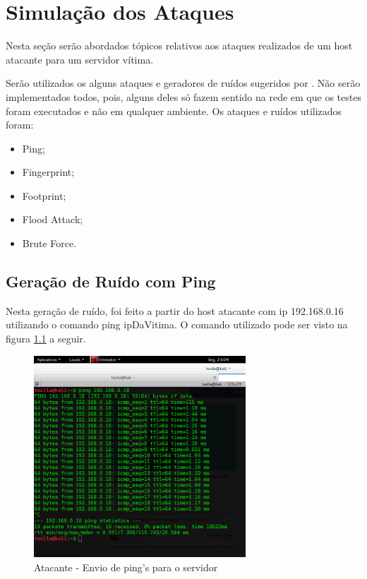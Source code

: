\chapter{Simulação dos Ataques}
\label{chap:Simulacao}

	Nesta seção serão abordados tópicos relativos aos ataques realizados de um
	host atacante para um servidor vítima.

	Serão utilizados os alguns ataques e geradores de ruídos sugeridos por \cite{Morais}.
	Não serão implementados todos, pois, alguns deles só fazem sentido na rede
	em que os testes foram executados e não em qualquer ambiente. Os ataques e ruídos
	utilizados foram:

	\begin{itemize}
		\item Ping;
		\item Fingerprint;
		\item Footprint;
		\item Flood Attack;
		\item Brute Force.
	\end{itemize}

	\section{Geração de Ruído com Ping}
	\label{sec:Geracao_de_Ruido_com_Ping}
	Nesta geração de ruído, foi feito a partir do host atacante com ip 192.168.0.16
	utilizando o comando ping ipDaVitima. O comando utilizado pode ser visto na
	figura \ref{fig:ping_atacante} a seguir.


	\begin{figure}[h]
	 \centering
	 \includegraphics[width=300px, scale=1]{resource/ping_atacante}
	 \caption{Atacante - Envio de ping's para o servidor}
 \label{fig:ping_atacante}
 \end{figure}

